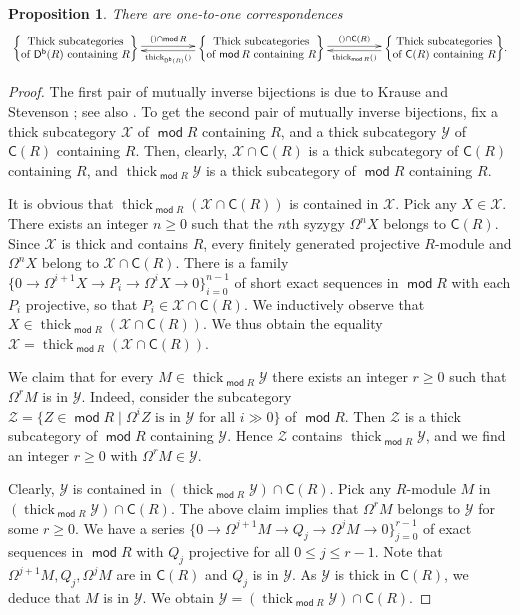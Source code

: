\documentclass{amsart}
\newtheorem{prop}[thm]{Proposition}
\theoremstyle{definition}
\theoremstyle{remark}
\numberwithin{equation}{thm}
\def\c{\mathsf{C}}
\def\Db{\operatorname{\mathsf{D^b}}}
\def\ge{\geqslant}
\def\le{\leqslant}
\def\mod{\operatorname{\mathsf{mod}}}
\def\syz{\Omega}
\def\thick{\operatorname{thick}}
\def\X{\mathcal{X}}
\def\Y{\mathcal{Y}}
\def\Z{\mathcal{Z}}
\begin{document}
\begin{prop}\label{2}
There are one-to-one correspondences
$$
\xymatrix@C+2pc{
{\left\{
\begin{matrix}
\text{Thick subcategories}\\
\text{of $\Db(R)$ containing $R$}
\end{matrix}
\right\}}
\ar@<.7mm>[r]^-{()\cap\mod R}
&
{\left\{
\begin{matrix}
\text{Thick subcategories}\\
\text{of $\mod R$ containing $R$}
\end{matrix}
\right\}}
\ar@<.7mm>[l]^-{\thick_{\Db(R)}()}
\ar@<.7mm>[r]^-{()\cap\c(R)}
&
{\left\{
\begin{matrix}
\text{Thick subcategories}\\
\text{of $\c(R)$ containing $R$}
\end{matrix}
\right\}}.
\ar@<.7mm>[l]^-{\thick_{\mod R}()}}
$$
\end{prop}

\begin{proof}
The first pair of mutually inverse bijections is due to Krause and Stevenson \cite[Theorem 1]{KS}; see also \cite[Lemma 10.5]{T23}.
To get the second pair of mutually inverse bijections, fix a thick subcategory $\X$ of $\mod R$ containing $R$, and a thick subcategory $\Y$ of $\c(R)$ containing $R$.
Then, clearly, $\X\cap\c(R)$ is a thick subcategory of $\c(R)$ containing $R$, and $\thick_{\mod R}\Y$ is a thick subcategory of $\mod R$ containing $R$.

It is obvious that $\thick_{\mod R}(\X\cap\c(R))$ is contained in $\X$.
Pick any $X\in\X$.
There exists an integer $n\ge0$ such that the $n$th syzygy $\syz^nX$ belongs to $\c(R)$.
Since $\X$ is thick and contains $R$, every finitely generated projective $R$-module and $\syz^nX$ belong to $\X\cap\c(R)$.
There is a family $\{0\to\syz^{i+1}X\to P_i\to\syz^iX\to0\}_{i=0}^{n-1}$ of short exact sequences in $\mod R$ with each $P_i$ projective, so that $P_i\in\X\cap\c(R)$.
We inductively observe that $X\in\thick_{\mod R}(\X\cap\c(R))$.
We thus obtain the equality $\X=\thick_{\mod R}(\X\cap\c(R))$.

We claim that for every $M\in\thick_{\mod R}\Y$ there exists an integer $r\ge0$ such that $\syz^rM$ is in $\Y$.
Indeed, consider the subcategory $\Z=\{Z\in\mod R\mid\text{$\syz^iZ$ is in $\Y$ for all $i\gg0$}\}$ of $\mod R$.
Then $\Z$ is a thick subcategory of $\mod R$ containing $\Y$.
Hence $\Z$ contains $\thick_{\mod R}\Y$, and we find an integer $r\ge0$ with $\syz^rM\in\Y$.

Clearly, $\Y$ is contained in $(\thick_{\mod R}\Y)\cap\c(R)$.
Pick any $R$-module $M$ in $(\thick_{\mod R}\Y)\cap\c(R)$.
The above claim implies that $\syz^rM$ belongs to $\Y$ for some $r\ge0$.
We have a series $\{0\to\syz^{j+1}M\to Q_j\to\syz^jM\to0\}_{j=0}^{r-1}$ of exact sequences in $\mod R$ with $Q_j$ projective for all $0\le j\le r-1$.
Note that $\syz^{j+1}M,Q_j,\syz^jM$ are in $\c(R)$ and $Q_j$ is in $\Y$.
As $\Y$ is thick in $\c(R)$, we deduce that $M$ is in $\Y$.
We obtain $\Y=(\thick_{\mod R}\Y)\cap\c(R)$.
\end{proof}
\end{document}
